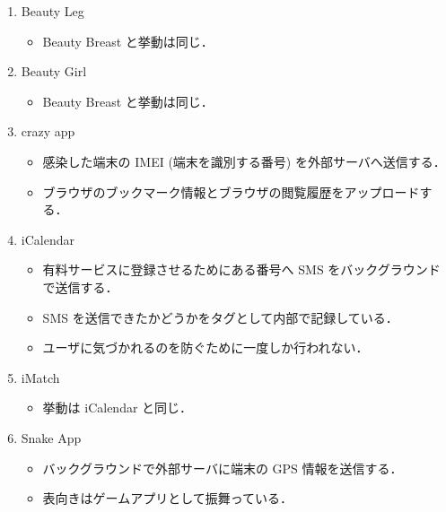 \begin{enumerate}
\item Beauty Leg
	\begin{itemize}
	\item Beauty Breast と挙動は同じ．
	\end{itemize}

\item Beauty Girl
	\begin{itemize}
	\item Beauty Breast と挙動は同じ．
	\end{itemize}

\item crazy app
	\begin{itemize}
	\item 感染した端末の IMEI (端末を識別する番号) を外部サーバへ送信する．
	\item  ブラウザのブックマーク情報とブラウザの閲覧履歴をアップロードする．
	\end{itemize}
\item iCalendar
	\begin{itemize}
	\item 有料サービスに登録させるためにある番号へ SMS をバックグラウンドで送信する．
	\item SMS  を送信できたかどうかをタグとして内部で記録している．
	\item ユーザに気づかれるのを防ぐために一度しか行われない．
	\end{itemize}
	
\item iMatch
	\begin{itemize}
	\item 挙動は iCalendar と同じ．
	\end{itemize}
	
\item Snake App
	\begin{itemize}
	\item バックグラウンドで外部サーバに端末の GPS 情報を送信する．
	\item 表向きはゲームアプリとして振舞っている．
	\end{itemize}
	


\end{enumerate}
